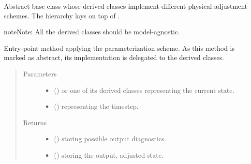 \documentclass[letterpaper,10pt,english]{sphinxmanual}
\begin{document}
\begin{fulllineitems}
\label{\detokenize{api:parameterizations.adjustments.Adjustment}}
Abstract base class whose derived classes implement different physical adjustment schemes.
The hierarchy lays on top of .

\begin{sphinxadmonition}{note}{Note:}
All the derived classes should be model-agnostic.
\end{sphinxadmonition}

\begin{fulllineitems}
\label{\detokenize{api:parameterizations.adjustments.Adjustment.__call__}}
Entry-point method applying the parameterization scheme.
As this method is marked as abstract, its implementation is delegated to the derived classes.
\begin{quote}\begin{description}
\item[{Parameters}] \leavevmode\begin{itemize}
\item {} 
 () \textendash{} {\hyperref[\detokenize{api:storages.grid_data.GridData}]{}} or one of its derived classes representing the current state.

\item {} 
 () \textendash{}  representing the timestep.

\end{itemize}

\item[{Returns}] \leavevmode
\begin{itemize}
\item {} 
 () \textendash{} {\hyperref[\detokenize{api:storages.grid_data.GridData}]{}} storing possible output diagnostics.

\item {} 
 () \textendash{} {\hyperref[\detokenize{api:storages.grid_data.GridData}]{}} storing the output, adjusted state.


\end{itemize}
\end{description}
\end{quote}
\end{fulllineitems}
\end{fulllineitems}
\end{document}
